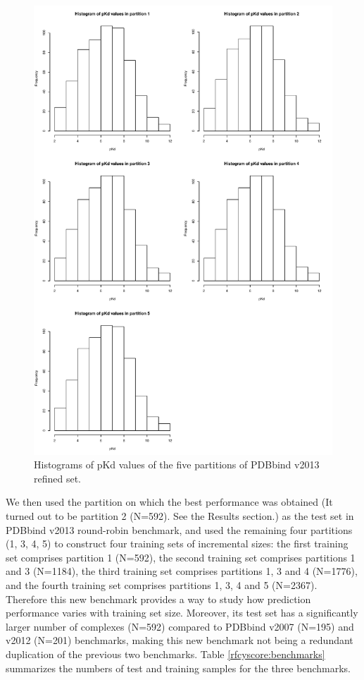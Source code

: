 \begin{figure}
\includegraphics[width=\linewidth]{../rfcyscore/cv.pdf}
\caption{Histograms of pKd values of the five partitions of PDBbind v2013 refined set.}
\label{rfcyscore:cv}
\end{figure}

We then used the partition on which the best performance was obtained (It turned out to be partition 2 (N=592). See the Results section.) as the test set in PDBbind v2013 round-robin benchmark, and used the remaining four partitions (1, 3, 4, 5) to construct four training sets of incremental sizes: the first training set comprises partition 1 (N=592), the second training set comprises partitions 1 and 3 (N=1184), the third training set comprises partitions 1, 3 and 4 (N=1776), and the fourth training set comprises partitions 1, 3, 4 and 5 (N=2367). Therefore this new benchmark provides a way to study how prediction performance varies with training set size. Moreover, its test set has a significantly larger number of complexes (N=592) compared to PDBbind v2007 (N=195) and v2012 (N=201) benchmarks, making this new benchmark not being a redundant duplication of the previous two benchmarks. Table \ref{rfcyscore:benchmarks} summarizes the numbers of test and training samples for the three benchmarks.

